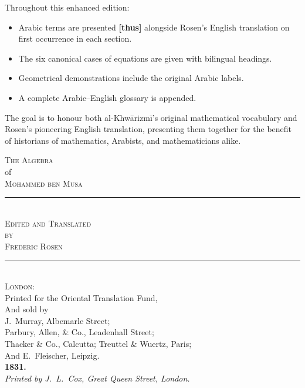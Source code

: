 \vspace{0.3cm}
\noindent Throughout this enhanced edition:
\begin{itemize}[leftmargin=2em]
\item Arabic terms are presented \textbf{[\arabicfont\beginR thus\endR]} alongside Rosen's English translation on first occurrence in each section.
\item The six canonical cases of equations are given with bilingual headings.
\item Geometrical demonstrations include the original Arabic labels.
\item A complete Arabic--English glossary is appended.
\end{itemize}

\vspace{0.3cm}
\noindent The goal is to honour both al-Khw\=arizm\=i's original mathematical vocabulary and Rosen's pioneering English translation, presenting them together for the benefit of historians of mathematics, Arabists, and mathematicians alike.

\clearpage


\thispagestyle{empty}
\begin{center}
\vspace*{2cm}

{\fontsize{28}{34}\selectfont\scshape\color{titlecolor} The Algebra}\\[0.8cm]
{\fontsize{14}{18}\selectfont\color{sectioncolor} of}\\[0.8cm]
{\fontsize{28}{34}\selectfont\scshape\color{titlecolor} Mohammed ben Musa}\\[2cm]

\rule{0.5\textwidth}{1pt}\\[1cm]

{\Large\scshape Edited and Translated}\\[0.3cm]
{\Large\scshape by}\\[0.3cm]
{\Large\scshape Frederic Rosen}\\[2cm]

\rule{0.5\textwidth}{1pt}\\[1cm]

{\normalsize
\textsc{London}:\\
Printed for the Oriental Translation Fund,\\
And sold by\\
J.~Murray, Albemarle Street;\\
Parbury, Allen, \& Co., Leadenhall Street;\\
Thacker \& Co., Calcutta; Treuttel \& Wuertz, Paris;\\
And E.~Fleischer, Leipzig.\\[0.5cm]
\textbf{1831.}
}\\[1cm]

{\small\textit{Printed by J.~L.~Cox, Great Queen Street, London.}}

\vfill
\end{center}
\clearpage

